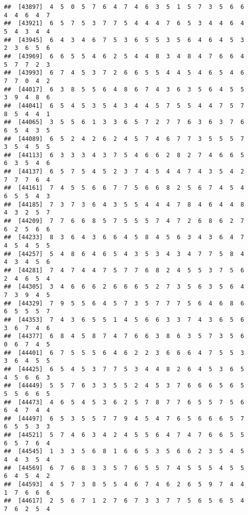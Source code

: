 \documentclass[
]{book}
\begin{document}
\begin{verbatim}
##  [43897]  4  5  0  5  7  6  4  7  4  6  3  5  1  5  7  3  5  6  6  4  4  6  4  7
##  [43921]  6  5  7  5  3  7  7  5  4  4  4  7  6  5  3  4  4  6  4  5  4  3  4  4
##  [43945]  6  4  3  4  6  7  5  3  6  5  5  3  5  6  4  6  4  5  3  2  3  6  5  6
##  [43969]  6  6  5  5  4  6  2  5  4  4  8  3  4  8  4  7  6  6  4  5  7  7  2  3
##  [43993]  6  7  4  5  3  7  2  6  6  5  5  4  4  5  4  6  5  4  6  7  7  0  4  2
##  [44017]  6  3  8  5  5  6  4  8  6  7  4  3  6  3  5  6  4  5  5  3  9  4  8  6
##  [44041]  6  5  4  5  3  5  4  3  4  4  5  7  5  5  4  4  7  5  7  8  5  4  4  1
##  [44065]  3  5  5  6  1  3  3  6  5  7  2  7  7  6  3  6  3  7  6  6  5  4  3  5
##  [44089]  6  5  2  4  2  6  2  4  5  7  4  6  7  7  3  5  5  5  7  3  5  4  5  5
##  [44113]  6  3  3  3  4  3  7  5  4  6  6  2  8  2  7  4  6  6  5  6  3  5  4  6
##  [44137]  6  5  7  5  4  5  2  3  7  4  5  4  4  7  4  3  5  4  2  7  7  7  6  4
##  [44161]  7  4  5  5  6  6  7  7  5  6  6  8  2  5  6  7  4  5  4  6  5  5  4  3
##  [44185]  7  3  7  3  6  4  3  5  5  4  4  4  7  8  4  6  4  4  8  4  3  2  5  7
##  [44209]  7  7  6  6  8  5  7  5  5  5  7  4  7  2  6  8  6  2  7  6  2  5  6  6
##  [44233]  8  3  6  4  3  6  6  4  5  8  4  5  6  3  4  3  6  4  7  4  5  4  5  5
##  [44257]  5  4  8  6  4  6  5  4  3  5  3  4  3  4  7  7  5  8  4  4  3  4  5  6
##  [44281]  7  4  7  4  4  7  5  7  7  6  8  2  4  5  5  3  7  5  6  2  4  6  5  4
##  [44305]  3  4  6  6  6  2  6  6  6  5  2  7  3  5  6  3  5  6  4  7  3  9  4  5
##  [44329]  7  9  5  5  6  4  5  7  3  5  7  7  7  5  6  4  6  8  6  6  5  5  5  7
##  [44353]  7  4  3  6  5  5  1  4  5  6  6  3  3  7  4  3  6  5  6  3  6  7  4  6
##  [44377]  6  8  4  5  8  7  4  7  6  6  3  8  6  3  5  7  3  5  6  0  6  7  4  5
##  [44401]  6  7  5  5  5  6  4  6  2  2  3  6  6  6  4  7  5  5  3  3  6  4  5  5
##  [44425]  6  5  4  5  3  7  7  5  3  4  4  8  2  6  4  5  3  6  5  4  5  6  6  3
##  [44449]  5  5  7  6  3  3  5  5  2  4  5  3  7  6  6  6  5  6  5  5  5  6  6  5
##  [44473]  4  6  5  4  5  3  6  2  5  7  8  7  7  6  5  5  7  5  6  6  4  7  4  4
##  [44497]  6  5  3  5  5  7  7  9  4  5  4  7  6  5  6  6  6  5  7  6  5  5  3  3
##  [44521]  5  7  4  6  3  4  2  4  5  5  6  4  7  4  7  6  6  5  5  6  5  7  6  4
##  [44545]  1  3  3  5  6  8  1  6  6  5  3  5  6  6  2  3  5  4  5  4  4  3  5  4
##  [44569]  6  7  6  8  3  3  5  7  6  5  5  7  4  5  5  5  4  5  5  6  4  5  4  2
##  [44593]  4  5  7  3  8  5  5  4  6  7  4  6  2  6  5  9  7  4  4  1  7  6  6  6
##  [44617]  2  5  6  7  1  2  7  6  7  3  3  7  7  5  6  5  6  5  4  7  6  2  5  4

\end{verbatim}
\end{document}

